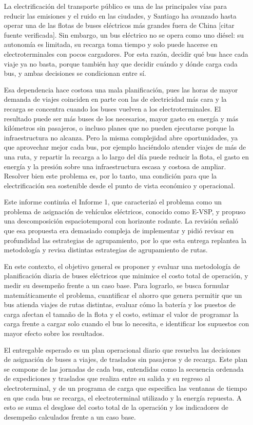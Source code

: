 La electrificación del transporte público es una de las principales vías para reducir las emisiones y el ruido en las ciudades, y Santiago ha avanzado hasta operar una de las flotas de buses eléctricos más grandes fuera de China [citar fuente verificada]. Sin embargo, un bus eléctrico no se opera como uno diésel: su autonomía es limitada, su recarga toma tiempo y solo puede hacerse en electroterminales con pocos cargadores. Por esta razón, decidir qué bus hace cada viaje ya no basta, porque también hay que decidir cuándo y dónde carga cada bus, y ambas decisiones se condicionan entre sí.

Esa dependencia hace costosa una mala planificación, pues las horas de mayor demanda de viajes coinciden en parte con las de electricidad más cara y la recarga se concentra cuando los buses vuelven a los electroterminales. El resultado puede ser más buses de los necesarios, mayor gasto en energía y más kilómetros sin pasajeros, o incluso planes que no pueden ejecutarse porque la infraestructura no alcanza. Pero la misma complejidad abre oportunidades, ya que aprovechar mejor cada bus, por ejemplo haciéndolo atender viajes de más de una ruta, y repartir la recarga a lo largo del día puede reducir la flota, el gasto en energía y la presión sobre una infraestructura escasa y costosa de ampliar. Resolver bien este problema es, por lo tanto, una condición para que la electrificación sea sostenible desde el punto de vista económico y operacional.

Este informe continúa el Informe 1, que caracterizó el problema como un problema de asignación de vehículos eléctricos, conocido como E-VSP, y propuso una descomposición espaciotemporal con horizonte rodante. La revisión señaló que esa propuesta era demasiado compleja de implementar y pidió revisar en profundidad las estrategias de agrupamiento, por lo que esta entrega replantea la metodología y revisa distintas estrategias de agrupamiento de rutas.

En este contexto, el objetivo general es proponer y evaluar una metodología de planificación diaria de buses eléctricos que minimice el costo total de operación, y medir su desempeño frente a un caso base. Para lograrlo, se busca formular matemáticamente el problema, cuantificar el ahorro que genera permitir que un bus atienda viajes de rutas distintas, evaluar cómo la batería y los puestos de carga afectan el tamaño de la flota y el costo, estimar el valor de programar la carga frente a cargar solo cuando el bus lo necesita, e identificar los supuestos con mayor efecto sobre los resultados.

El entregable esperado es un plan operacional diario que resuelva las decisiones de asignación de buses a viajes, de traslados sin pasajeros y de recarga. Este plan se compone de las jornadas de cada bus, entendidas como la secuencia ordenada de expediciones y traslados que realiza entre su salida y su regreso al electroterminal, y de un programa de carga que especifica las ventanas de tiempo en que cada bus se recarga, el electroterminal utilizado y la energía repuesta. A esto se suma el desglose del costo total de la operación y los indicadores de desempeño calculados frente a un caso base.

